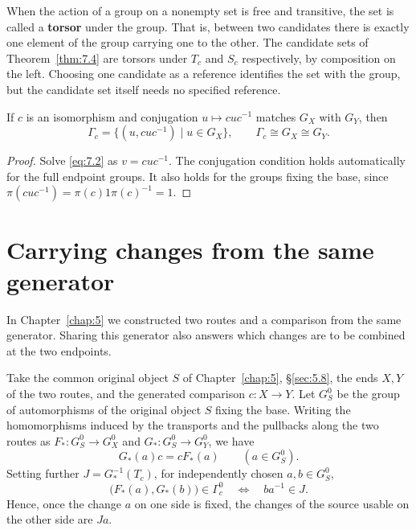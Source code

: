 When the action of a group on a nonempty set is free and transitive, the set is called a
\textbf{torsor} under the group.
That is, between two candidates there is exactly one element of the group carrying one to
the other.
The candidate sets of Theorem~\ref{thm:7.4} are torsors under $T_c$ and $S_c$ respectively,
by composition on the left.
Choosing one candidate as a reference identifies the set with the group, but the candidate
set itself needs no specified reference.

\begin{corollary}\label{cor:7.5}

If $c$ is an isomorphism and conjugation $u\mapsto cuc^{-1}$ matches $G_X$ with $G_Y$, then
\begin{equation*}
\Gamma_c=\{(u,cuc^{-1})\mid u\in G_X\},\qquad
\Gamma_c\cong G_X\cong G_Y.
\tag{7.6}\label{eq:7.6}
\end{equation*}

\end{corollary}

\begin{proof}

Solve \eqref{eq:7.2} as $v=cuc^{-1}$.
The conjugation condition holds automatically for the full endpoint groups.
It also holds for the groups fixing the base, since
$\pi(cuc^{-1})=\pi(c)1\pi(c)^{-1}=1$.

\end{proof}

\section{Carrying changes from the same generator}\label{sec:7.2}

In Chapter~\ref{chap:5} we constructed two routes and a comparison from the same generator.
Sharing this generator also answers which changes are to be combined at the two endpoints.

\begin{theorem}\label{thm:7.6}

Take the common original object $S$ of Chapter~\ref{chap:5}, \S\ref{sec:5.8}, the ends
$X,Y$ of the two routes, and the generated comparison $c:X\to Y$.
Let $G_S^0$ be the group of automorphisms of the original object $S$ fixing the base.
Writing the homomorphisms induced by the transports and the pullbacks along the two routes
as $F_*:G_S^0\to G_X^0$ and $G_*:G_S^0\to G_Y^0$, we have
\begin{equation*}
G_*(a)c=cF_*(a)\qquad(a\in G_S^0).
\tag{7.7}\label{eq:7.7}
\end{equation*}
Setting further $J=G_*^{-1}(T_c)$, for independently chosen $a,b\in G_S^0$,
\begin{equation*}
\bigl(F_*(a),G_*(b)\bigr)\in\Gamma_c^0
\quad\Longleftrightarrow\quad ba^{-1}\in J.
\tag{7.8}\label{eq:7.8}
\end{equation*}
Hence, once the change $a$ on one side is fixed, the changes of the source usable on the
other side are $Ja$.

\end{theorem}

